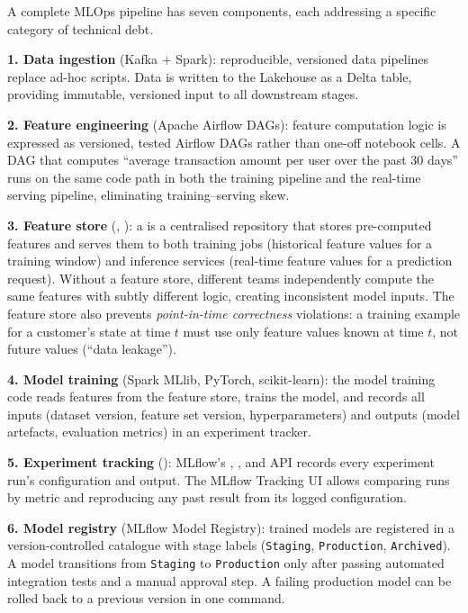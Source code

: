 A complete MLOps pipeline has seven components, each addressing a specific
category of technical debt.

\textbf{1. Data ingestion} (Kafka + Spark): reproducible, versioned data
pipelines replace ad-hoc scripts. Data is written to the Lakehouse as a
Delta table, providing immutable, versioned input to all downstream stages.

\textbf{2. Feature engineering} (Apache Airflow DAGs): feature computation
logic is expressed as versioned, tested Airflow DAGs rather than one-off
notebook cells. A DAG that computes ``average transaction amount per user
over the past 30 days'' runs on the same code path in both the training
pipeline and the real-time serving pipeline, eliminating training--serving
skew.

\textbf{3. Feature store} (, ): a  is a centralised repository that stores pre-computed features and
serves them to both training jobs (historical feature values for a training
window) and inference services (real-time feature values for a prediction
request). Without a feature store, different teams independently compute
the same features with subtly different logic, creating inconsistent model
inputs. The feature store also prevents \emph{point-in-time correctness}
violations: a training example for a customer's state at time $t$ must
use only feature values known at time $t$, not future values
(``data leakage'').

\textbf{4. Model training} (Spark MLlib, PyTorch, scikit-learn): the
model training code reads features from the feature store, trains the
model, and records all inputs (dataset version, feature set version,
hyperparameters) and outputs (model artefacts, evaluation metrics) in
an experiment tracker.

\textbf{5. Experiment tracking} (): MLflow's ,
, and  API records
every experiment run's configuration and output. The MLflow Tracking UI
allows comparing runs by metric and reproducing any past result from
its logged configuration.

\textbf{6. Model registry} (MLflow Model Registry): trained models are
registered in a version-controlled catalogue with stage labels
(\texttt{Staging}, \texttt{Production}, \texttt{Archived}).
A model transitions from \texttt{Staging} to \texttt{Production} only
after passing automated integration tests and a manual approval step.
A failing production model can be rolled back to a previous version in
one command.

